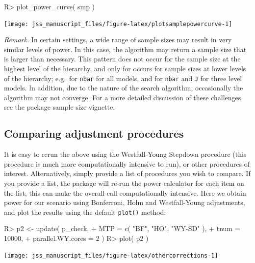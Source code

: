 \documentclass[
]{jss}
\begin{document}
\begin{CodeChunk}
\begin{CodeInput}
R> plot_power_curve( smp )
\end{CodeInput}


\begin{center}\texttt{[image: jss\_manuscript\_files/figure-latex/plotsamplepowercurve-1]} \end{center}

\end{CodeChunk}

\emph{Remark.} In certain settings, a wide range of sample sizes may
result in very similar levels of power. In this case, the algorithm may
return a sample size that is larger than necessary. This pattern does
not occur for the sample size at the highest level of the hierarchy, and
only for occurs for sample sizes at lower levels of the hierarchy;
e.g.~for \texttt{nbar} for all models, and for \texttt{nbar} and
\texttt{J} for three level models. In addition, due to the nature of the
search algorithm, occasionally the algorithm may not converge. For a
more detailed discussion of these challenges, see the package sample
size vignette.

\subsection{Comparing adjustment procedures}

It is easy to rerun the above using the Westfall-Young Stepdown
procedure (this procedure is much more computationally intensive to
run), or other procedures of interest. Alternatively, simply provide a
list of procedures you wish to compare. If you provide a list, the
package will re-run the power calculator for each item on the list; this
can make the overall call computationally intensive. Here we obtain
power for our scenario using Bonferroni, Holm and Westfall-Young
adjustments, and plot the results using the default \texttt{plot()}
method:

\begin{CodeChunk}
\begin{CodeInput}
R> p2 <- update( p_check,
+               MTP = c( "BF", "HO", "WY-SD" ),
+               tnum = 10000,
+               parallel.WY.cores = 2 )
R> plot( p2 )
\end{CodeInput}


\begin{center}\texttt{[image: jss\_manuscript\_files/figure-latex/othercorrections-1]} \end{center}

\end{CodeChunk}
\end{document}
